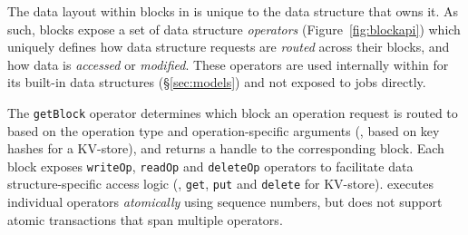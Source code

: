  The data layout within blocks in \jiffy is unique to the data structure that owns it. As such, \jiffy blocks expose a set of data structure \textit{operators} (Figure~\ref{fig:blockapi}) which uniquely defines how data structure requests are \textit{routed} across their blocks, and how data is \textit{accessed} or \textit{modified}. These operators are used internally within \jiffy for its built-in data structures (\S\ref{sec:models}) and not exposed to jobs directly. %

The \texttt{getBlock} operator determines which block an operation request is routed to based on the operation type and operation-specific arguments (\eg, based on key hashes for a KV-store), and returns a handle to the corresponding block. Each \jiffy block exposes \texttt{writeOp}, \texttt{readOp} and \texttt{deleteOp} operators to facilitate data structure-specific access logic (\eg, \texttt{get}, \texttt{put} and \texttt{delete} for KV-store). \jiffy executes individual operators \textit{atomically} using sequence numbers, but does not support atomic transactions that span multiple operators. %

